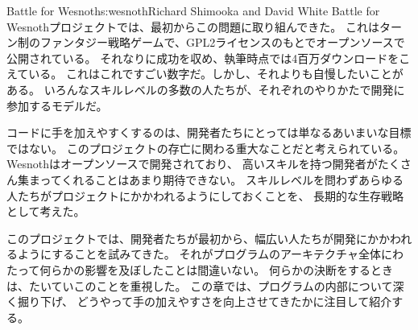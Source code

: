 \begin{aosachapter}{Battle for Wesnoth}{s:wesnoth}{Richard Shimooka and David White}
Battle for Wesnothプロジェクトでは、最初からこの問題に取り組んできた。
これはターン制のファンタジー戦略ゲームで、GPL2ライセンスのもとでオープンソースで公開されている。
それなりに成功を収め、執筆時点では4百万ダウンロードをこえている。
これはこれですごい数字だ。しかし、それよりも自慢したいことがある。
いろんなスキルレベルの多数の人たちが、それぞれのやりかたで開発に参加するモデルだ。

コードに手を加えやすくするのは、開発者たちにとっては単なるあいまいな目標ではない。
このプロジェクトの存亡に関わる重大なことだと考えられている。
Wesnothはオープンソースで開発されており、
高いスキルを持つ開発者がたくさん集まってくれることはあまり期待できない。
スキルレベルを問わずあらゆる人たちがプロジェクトにかかわれるようにしておくことを、
長期的な生存戦略として考えた。

このプロジェクトでは、開発者たちが最初から、幅広い人たちが開発にかかわれるようにすることを試みてきた。
それがプログラムのアーキテクチャ全体にわたって何らかの影響を及ぼしたことは間違いない。
何らかの決断をするときは、たいていこのことを重視した。
この章では、プログラムの内部について深く掘り下げ、
どうやって手の加えやすさを向上させてきたかに注目して紹介する。


\end{aosachapter}
